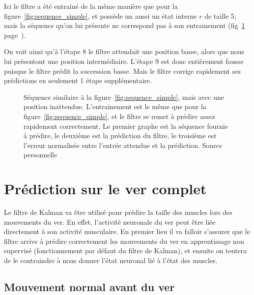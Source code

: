 Ici le filtre a été entrainé de la même manière que pour la
figure~\ref{fig:sequence_simple}, et possède un aussi un état interne $r$ de
taille 5; mais la séquence qu'on lui présente ne correspond pas à son
entrainement (fig~\ref{fig:sequence_simple_erreur}
page~\pageref{fig:sequence_simple_erreur}).

On voit ainsi qu'à l'étape 8 le filtre attendait une position basse, alors que
nous lui présentont une position intermédiaire. L'étape 9 est donc entièrement
fausse puisque le filtre prédit la succession basse. Mais le filtre corrige
rapidement ses prédictions en seulement 1 étape supplémentaire.

\begin{figure}[ht]
   \begin{center}
   \end{center}
   \caption[Prédiction de séquence simple, avec erreur]{Séquence similaire à la
   figure~\ref{fig:sequence_simple}, mais avec une position inattendue.
   L'entrainement est le même que pour la figure~\ref{fig:sequence_simple}, et
   le filtre se remet à prédire assez rapidement correctement. Le premier graphe
   est la séquence fournie à prédire, le deuxième est la prédiction du filtre,
   le troisième est l'erreur normalisée entre l'entrée attendue et la
   prédiction. Source personnelle}
   \label{fig:sequence_simple_erreur}
\end{figure}



\section{Prédiction sur le ver complet} %
\label{sec:Prédiction sur le ver complet}

Le filtre de Kalman va être utilisé pour prédire la taille des muscles lors
des mouvements du ver. En effet, l'activité neuronale du ver peut être liée
directement à son activité musculaire. En premier lieu il va falloir
s'assurer que le filtre arrive à prédire correctement les mouvements du ver en
apprentissage non supervisé (fonctionnement par défaut du filtre de Kalman), et
ensuite on tentera de le contraindre à nous donner l'état neuronal lié à
l'état des muscles.

\subsection{Mouvement normal avant du ver} %
\label{sub:Mouvement normal avant du ver}

